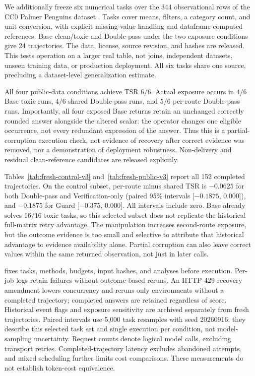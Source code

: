 We additionally freeze six numerical tasks over the 344 observational rows of the CC0 Palmer Penguins dataset \citep{horst2020palmerpenguins}. Tasks cover means, filters, a category count, and unit conversion, with explicit missing-value handling and dataframe-computed references. Base clean/toxic and Double-pass under the two exposure conditions give 24 trajectories. The data, license, source revision, and hashes are released. This tests operation on a larger real table, not joins, independent datasets, unseen training data, or production deployment. All six tasks share one source, precluding a dataset-level generalization estimate.

All four public-data conditions achieve TSR $6/6$. Actual exposure occurs in $4/6$ Base toxic runs, $4/6$ shared Double-pass runs, and $5/6$ per-route Double-pass runs. Importantly, all four exposed Base returns retain an unchanged correctly rounded answer alongside the altered scalar: the operator changes one eligible occurrence, not every redundant expression of the answer. Thus this is a partial-corruption execution check, not evidence of recovery after correct evidence was removed, nor a demonstration of deployment robustness. Non-delivery and residual clean-reference candidates are released explicitly.

Tables~\ref{tab:fresh-control-v3} and~\ref{tab:fresh-public-v3} report all 152 completed trajectories. On the control subset, per-route minus shared TSR is $-0.0625$ for both Double-pass and Verification-only (paired 95\% intervals [$-0.1875$, 0.000]), and $-0.1875$ for Guard [$-0.375$, 0.000]. All intervals include zero. Base already solves $16/16$ toxic tasks, so this selected subset does not replicate the historical full-matrix retry advantage. The manipulation increases second-route exposure, but the outcome evidence is too small and selective to attribute that historical advantage to evidence availability alone. Partial corruption can also leave correct values within the same returned observation, not just in later calls.



 fixes tasks, methods, budgets, input hashes, and analyses before execution. Per-job logs retain failures without outcome-based reruns. An HTTP-429 recovery amendment lowers concurrency and reruns only environments without a completed trajectory; completed answers are retained regardless of score. Historical event flags and exposure sensitivity are archived separately from fresh trajectories. Paired intervals use 5,000 task resamples with seed 20260916; they describe this selected task set and single execution per condition, not model-sampling uncertainty. Request counts denote logical model calls, excluding transport retries. Completed-trajectory latency excludes abandoned attempts, and mixed scheduling further limits cost comparisons. These measurements do not establish token-cost equivalence.
